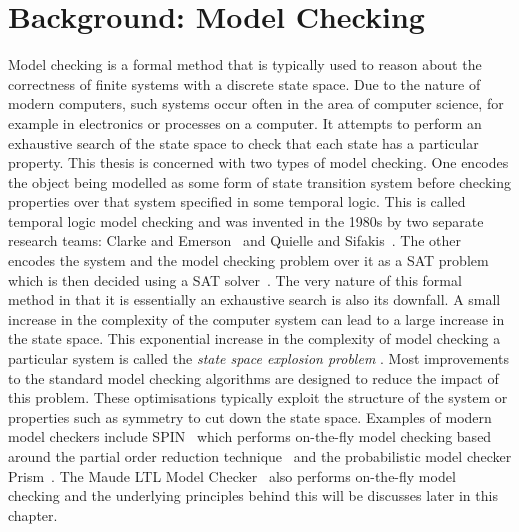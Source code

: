 \chapter{Background: Model Checking}
Model checking is a formal method that is typically used to reason about the correctness of finite systems with a discrete state space. Due to the nature of modern computers, such systems occur often in the area of computer science, for example in electronics or processes on a computer. It attempts to perform an exhaustive search of the state space to check that each state has a particular property. This thesis is concerned with two types of model checking. One encodes the object being modelled as some form of state transition system before checking properties over that system specified in some temporal logic. This is called temporal logic model checking and was invented in the 1980s by two separate research teams:  Clarke and Emerson~\cite{EM82} and Quielle and Sifakis~\cite{JQ82}. The other encodes the system and the model checking problem over it as a SAT problem which is then decided using a SAT solver~\cite{MS00}. The very nature of this formal method in that it is essentially an exhaustive search is also its downfall. A small increase in the complexity of the computer system can lead to a large increase in the state space. This exponential increase in the complexity of model checking a particular system is called the  \emph{state space explosion problem} \cite{EC01b,RP09}. Most improvements to the standard model checking algorithms are designed to reduce the impact of this problem. These optimisations typically exploit the structure of the system or properties such as symmetry to cut down the state space. Examples of modern model checkers include SPIN~\cite{GH04} which performs on-the-fly model checking  based around the partial order reduction technique~\cite{DP94}  and the probabilistic model checker Prism~\cite{MK11}. The Maude LTL Model Checker~\cite{ES00} also performs on-the-fly model checking and the underlying principles behind this will be discusses later in this chapter.

